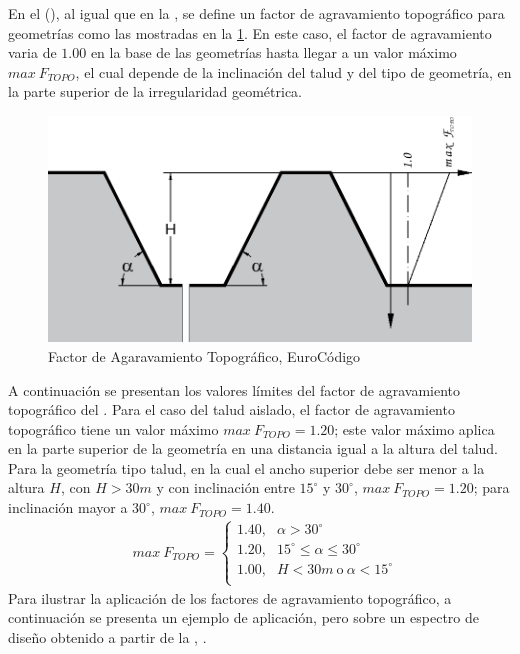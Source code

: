 \documentclass[spanish,letterpaper,12pt,twoside,openany]{article}
\begin{document}
En el \citeauthor{EC8} (\citeyear{EC8}), al igual que en la \citeauthor{AFPS1995}, se define un factor de agravamiento topográfico para geometrías como las mostradas en la \cref{fig:ec8}. En este caso, el factor de agravamiento varia de $1.00$ en la base de las geometrías hasta llegar a un valor máximo $max\ F_{TOPO}$, el cual depende de la inclinación del talud y del tipo de geometría, en la parte superior de la irregularidad geométrica.
%
\begin{figure}[H]
	\centering
	\includegraphics[width=10 cm]{img/EC8_Juan.pdf}
	\caption{Factor de Agaravamiento Topográfico, EuroCódigo}
	\label{fig:ec8}
\end{figure}
%
A continuación se presentan los valores límites del factor de agravamiento topográfico del \citeauthor{EC8}. Para el caso del talud aislado, el factor de agravamiento topográfico tiene un valor máximo $max\ F_{TOPO}=1.20$; este valor máximo aplica en la parte superior de la geometría en una distancia igual a la altura del talud. Para la geometría tipo talud, en la cual el ancho superior debe ser menor a la altura $H$, con $H>30 m$ y con inclinación entre $15^{\circ}$ y $30^{\circ}$, $max\ F_{TOPO}=1.20$; para inclinación mayor a $30^{\circ}$, $max\ F_{TOPO}=1.40$. 
%
\begin{align*}
&max\ F_{TOPO} =
  \begin{cases}
	1.40 \text{,} &  \alpha > 30^{\circ} \\
	1.20 \text{,} &  15^{\circ} \leq \alpha \leq 30^{\circ} \\
	1.00 \text{,} &  H<30 m\ \text{o}\  \alpha < 15^{\circ} \\
  \end{cases}
\end{align*}
%
Para ilustrar la aplicación de los factores de agravamiento topográfico, a continuación se presenta un ejemplo de aplicación, pero sobre un espectro de diseño obtenido a partir de la \citeauthor{NSR-10}, \citeyear{NSR-10}.\\
\end{document}
